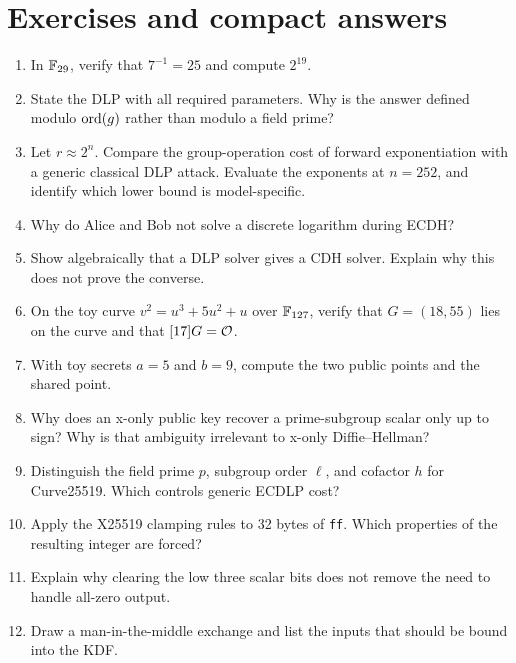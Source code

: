 \section{Exercises and compact answers}

\begin{enumerate}
  \item In $\mathbb{F}_{29}$, verify that $7^{-1}=25$ and compute $2^{19}$.

  \item State the DLP with all required parameters. Why is the answer defined
        modulo $\operatorname{ord}(g)$ rather than modulo a field prime?

  \item Let $r\approx2^n$. Compare the group-operation cost of forward
        exponentiation with a generic classical DLP attack. Evaluate the
        exponents at $n=252$, and identify which lower bound is model-specific.

  \item Why do Alice and Bob not solve a discrete logarithm during ECDH?

  \item Show algebraically that a DLP solver gives a CDH solver. Explain why
        this does not prove the converse.

  \item On the toy curve $v^2=u^3+5u^2+u$ over $\mathbb{F}_{127}$, verify that
        $G=(18,55)$ lies on the curve and that $[17]G=\mathcal{O}$.

  \item With toy secrets $a=5$ and $b=9$, compute the two public points and
        the shared point.

  \item Why does an x-only public key recover a prime-subgroup scalar only up
        to sign? Why is that ambiguity irrelevant to x-only Diffie--Hellman?

  \item Distinguish the field prime $p$, subgroup order $\ell$, and cofactor
        $h$ for Curve25519. Which controls generic ECDLP cost?

  \item Apply the X25519 clamping rules to 32 bytes of \texttt{ff}. Which
        properties of the resulting integer are forced?

  \item Explain why clearing the low three scalar bits does not remove the
        need to handle all-zero output.

  \item Draw a man-in-the-middle exchange and list the inputs that should be
        bound into the KDF.
\end{enumerate}
